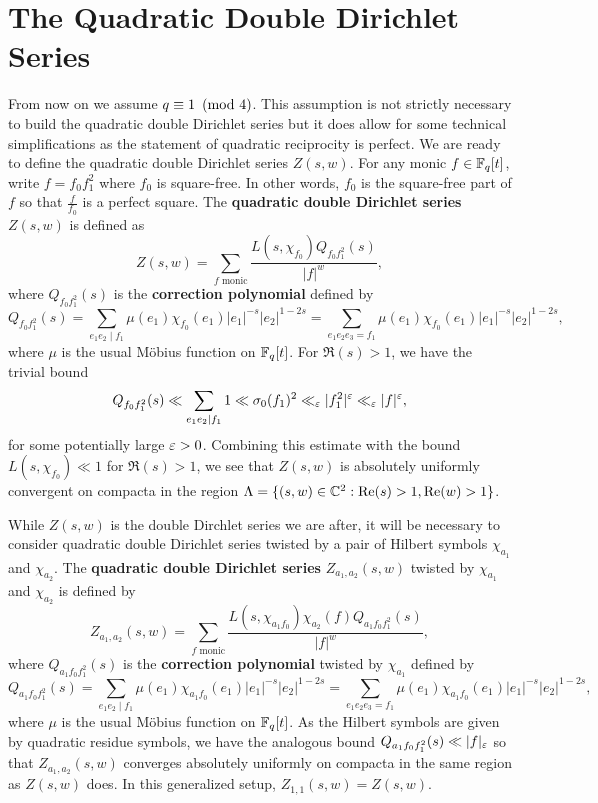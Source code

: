 \documentclass[12pt,reqno,oneside]{amsart}
\begin{document}
\section{The Quadratic Double Dirichlet Series}
    From now on we assume $q \equiv 1 \ \left(\text{mod }4\right)$. This assumption is not strictly necessary to build the quadratic double Dirichlet series but it does allow for some technical simplifications as the statement of quadratic reciprocity is perfect. We are ready to define the quadratic double Dirichlet series $Z(s,w)$. For any monic $f \in \mathbb{F}_{q}[t]$, write $f = f_{0}f_{1}^{2}$ where $f_{0}$ is square-free. In other words, $f_{0}$ is the square-free part of $f$ so that $\frac{f}{f_{0}}$ is a perfect square. The \textbf{quadratic double Dirichlet series} $Z(s,w)$ is defined as
    \[
        Z(s,w) = \sum_{\text{$f$ monic}}\frac{L(s,\chi_{f_{0}})Q_{f_{0}f_{1}^{2}}(s)}{|f|^{w}},
    \]
    where $Q_{f_{0}f_{1}^{2}}(s)$ is the \textbf{correction polynomial} defined by
    \[
        Q_{f_{0}f_{1}^{2}}(s) = \sum_{e_{1}e_{2} \mid f_{1}}\mu(e_{1})\chi_{f_{0}}(e_{1})|e_{1}|^{-s}|e_{2}|^{1-2s} = \sum_{e_{1}e_{2}e_{3} = f_{1}}\mu(e_{1})\chi_{f_{0}}(e_{1})|e_{1}|^{-s}|e_{2}|^{1-2s},
    \]
    where $\mu$ is the usual M\"obius function on $\mathbb{F}_{q}[t]$. For $\Re(s) > 1$, we have the trivial bound
    \[
        Q_{f_{0}f_{1}^{2}}(s) \ll \sum_{e_{1}e_{2} \mid f_{1}}1 \ll \sigma_{0}(f_{1})^{2} \ll_{\varepsilon} |f_{1}^{2}|^{\varepsilon} \ll_{\varepsilon} |f|^{\varepsilon},
    \]
    for some potentially large $\varepsilon > 0$. Combining this estimate with the bound $L(s,\chi_{f_{0}}) \ll 1$ for $\Re(s) > 1$, we see that $Z(s,w)$ is absolutely uniformly convergent on compacta in the region $\Lambda = \{(s,w) \in \mathbb{C}^{2}:\mathrm{Re}(s) > 1, \mathrm{Re}(w) > 1\}$.

    While $Z(s,w)$ is the double Dirchlet series we are after, it will be necessary to consider quadratic double Dirichlet series twisted by a pair of Hilbert symbols $\chi_{a_{1}}$ and $\chi_{a_{2}}$. The \textbf{quadratic double Dirichlet series} $Z_{a_{1},a_{2}}(s,w)$ twisted by $\chi_{a_{1}}$ and $\chi_{a_{2}}$ is defined by
    \[
        Z_{a_{1},a_{2}}(s,w) = \sum_{\text{$f$ monic}}\frac{L(s,\chi_{a_{1}f_{0}})\chi_{a_{2}}(f)Q_{a_{1}f_{0}f_{1}^{2}}(s)}{|f|^{w}},
    \]
    where $Q_{a_{1}f_{0}f_{1}^{2}}(s)$ is the \textbf{correction polynomial} twisted by $\chi_{a_{1}}$ defined by
    \[
        Q_{a_{1}f_{0}f_{1}^{2}}(s) = \sum_{e_{1}e_{2} \mid f_{1}}\mu(e_{1})\chi_{a_{1}f_{0}}(e_{1})|e_{1}|^{-s}|e_{2}|^{1-2s} = \sum_{e_{1}e_{2}e_{3} = f_{1}}\mu(e_{1})\chi_{a_{1}f_{0}}(e_{1})|e_{1}|^{-s}|e_{2}|^{1-2s},
    \]
    where $\mu$ is the usual M\"obius function on $\mathbb{F}_{q}[t]$. As the Hilbert symbols are given by quadratic residue symbols, we have the analogous bound $Q_{a_{1}f_{0}f_{1}^{2}}(s) \ll |f|_{\varepsilon}$ so that $Z_{a_{1},a_{2}}(s,w)$ converges absolutely uniformly on compacta in the same region as $Z(s,w)$ does. In this generalized setup, $Z_{1,1}(s,w) = Z(s,w)$.
\end{document}
